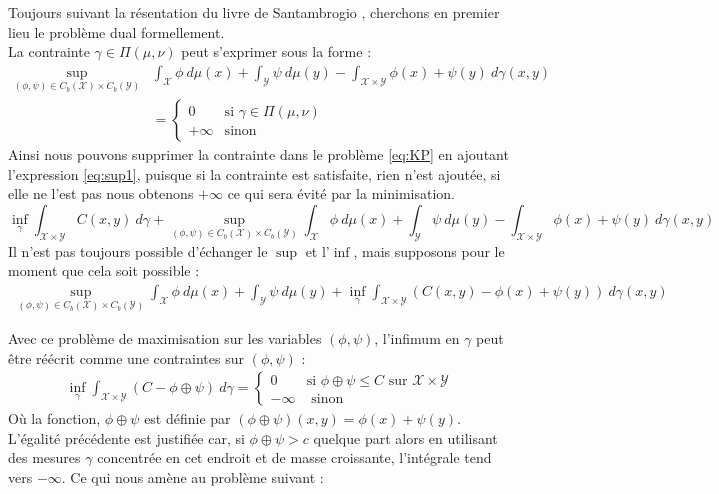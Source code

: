 \documentclass[a4paper,12pt]{article}
\begin{document}
Toujours suivant la résentation du livre de Santambrogio \cite{santambrogio2015optimal}, cherchons en premier lieu le problème dual formellement. \\
La contrainte $\gamma\in\Pi(\mu,\nu)$ peut s'exprimer sous la forme : 
\begin{align}
\sup_{(\phi,\psi)\in C_b(\mathcal{X})\times C_b(\mathcal{Y})}& \int_{\mathcal{X}} \phi\ d\mu (x) + \int_{\mathcal{Y}}\psi\  d\mu(y) - \int_{\mathcal{X}\times\mathcal{Y}}\phi(x)+\psi(y)\ d\gamma(x,y)\label{eq:sup1}\\
&= \left\{\begin{array}{cl}
0 & \text{si } \gamma \in\Pi(\mu,\nu)\\
+\infty & \text{sinon}
\end{array}\right.\nonumber
\end{align}
Ainsi nous pouvons supprimer la contrainte dans le problème \eqref{eq:KP} en ajoutant l'expression \eqref{eq:sup1}, puisque si la contrainte est satisfaite, rien n'est ajoutée, si elle ne l'est pas nous obtenons $+\infty$ ce qui sera évité par la minimisation. 
$$
\inf_{\gamma} \int_{\mathcal{X}\times\mathcal{Y}} C(x,y)\ d\gamma + \sup_{(\phi,\psi)\in C_b(\mathcal{X})\times C_b(\mathcal{Y})} \int_{\mathcal{X}} \phi\ d\mu (x) + \int_{\mathcal{Y}}\psi\  d\mu(y) - \int_{\mathcal{X}\times\mathcal{Y}}\phi(x)+\psi(y)\ d\gamma(x,y)
$$
Il n'est pas toujours possible d'échanger le $\sup$ et l'$\inf$, mais supposons pour le moment que cela soit possible : 
\begin{align}
\sup_{(\phi,\psi)\in C_b(\mathcal{X})\times C_b(\mathcal{Y})} \int_{\mathcal{X}} \phi\ d\mu (x) + \int_{\mathcal{Y}}\psi\  d\mu(y) + \inf_{\gamma} \int_{\mathcal{X}\times\mathcal{Y}}(C(x,y) - \phi(x)+\psi(y))\ d\gamma(x,y)
\label{eq:infsupexchange}
\end{align}

Avec ce problème de maximisation sur les variables $(\phi,\psi)$, l'infimum en $\gamma$ peut être réécrit comme une contraintes sur $(\phi,\psi)$ : 
\begin{align}
\inf_{\gamma} \int_{\mathcal{X}\times\mathcal{Y}}(C - \phi\oplus\psi) \ d\gamma = 
\left\{
\begin{array}{cl}
0 & \text{si } \phi\oplus\psi\leq C \text{ sur } \mathcal{X}\times\mathcal{Y}\\
-\infty &\text{ sinon}
\end{array}
\right.
\end{align}
Où la fonction, $\phi\oplus\psi$ est définie par $(\phi\oplus\psi)(x,y) = \phi(x)+\psi(y)$. L'égalité précédente est justifiée car, si $\phi\oplus\psi>c$ quelque part alors en utilisant des mesures $\gamma$ concentrée en cet endroit et de masse croissante, l'intégrale tend vers $-\infty$. Ce qui nous amène au problème suivant : \\
\end{document}
